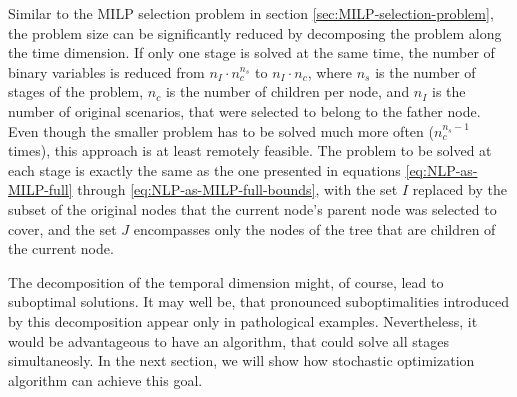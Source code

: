\documentclass[a4paper, 12pt] {article}
\begin{document}
Similar to the MILP selection problem in section \ref{sec:MILP-selection-problem}, the problem size can be significantly reduced by decomposing the problem along the time dimension. If only one stage is solved at the same time, the number of binary variables is reduced from $n_I\cdot n_c^{n_s}$ to $n_I\cdot n_c$, where $n_s$ is the number of stages of the problem, $n_c$ is the number of children per node, and $n_I$ is the number of original scenarios, that were selected to belong to the father node. Even though the smaller problem has to be solved much more often ($n_c^{n_s-1}$ times), this approach is at least remotely feasible. The problem to be solved at each stage is exactly the same as the one presented in equations \ref{eq:NLP-as-MILP-full} through \ref{eq:NLP-as-MILP-full-bounds}, with the set $I$ replaced by the subset of the original nodes that the current node's parent node was selected to cover, and the set $J$ encompasses only the nodes of the tree that are children of the current node.

The decomposition of the temporal dimension might, of course, lead to suboptimal solutions. It may well be, that pronounced suboptimalities introduced by this decomposition appear only in pathological examples. Nevertheless, it would be advantageous to have an algorithm, that could solve all stages simultaneosly. In the next section, we will show how stochastic optimization algorithm can achieve this goal.
\end{document}
